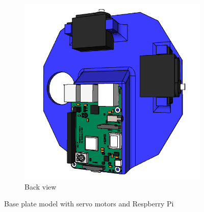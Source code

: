 \begin{figure}[ht]
\begin{subfigure}{0.6\textwidth}
    \includegraphics[width=\textwidth]{src/assets/pictures/construction/base_plate_back.png}
    \caption{Back view}
    \label{fig:const:int:base_back}
  \end{subfigure}
  \caption{Base plate model with servo motors and Respberry Pi}
  \label{fig:const:int:base}
\end{figure}